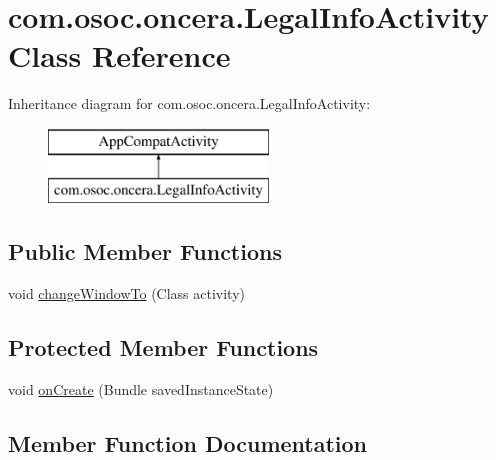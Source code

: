 \hypertarget{classcom_1_1osoc_1_1oncera_1_1_legal_info_activity}{}\section{com.\+osoc.\+oncera.\+Legal\+Info\+Activity Class Reference}
\label{classcom_1_1osoc_1_1oncera_1_1_legal_info_activity}
Inheritance diagram for com.\+osoc.\+oncera.\+Legal\+Info\+Activity\+:\begin{figure}[H]
\begin{center}
\leavevmode
\includegraphics[height=2.000000cm]{classcom_1_1osoc_1_1oncera_1_1_legal_info_activity}
\end{center}
\end{figure}
\subsection*{Public Member Functions}
\begin{DoxyCompactItemize}
\item 
void \mbox{\hyperlink{classcom_1_1osoc_1_1oncera_1_1_legal_info_activity_ac7507ef17c8ce150df75081c487b5b9f}{change\+Window\+To}} (Class activity)
\end{DoxyCompactItemize}
\subsection*{Protected Member Functions}
\begin{DoxyCompactItemize}
\item 
void \mbox{\hyperlink{classcom_1_1osoc_1_1oncera_1_1_legal_info_activity_abe501f63ff9839ff8948405fce159e0a}{on\+Create}} (Bundle saved\+Instance\+State)
\end{DoxyCompactItemize}


\subsection{Member Function Documentation}
\mbox{\label{classcom_1_1osoc_1_1oncera_1_1_legal_info_activity_ac7507ef17c8ce150df75081c487b5b9f}} 
